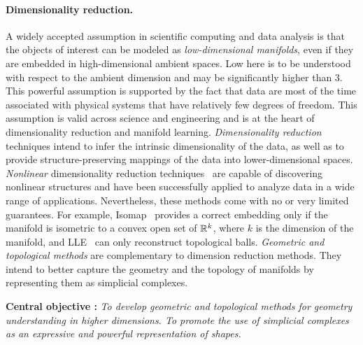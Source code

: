 \paragraph{Dimensionality reduction.} A widely accepted assumption in scientific computing and data analysis is that the objects of interest can be modeled as {\em low-dimensional manifolds}, even if they are embedded in high-dimensional ambient spaces. Low here is to be understood with respect to the ambient dimension and may be significantly higher than 3. This powerful assumption is supported by the fact that data are most of the time associated with physical systems that have relatively few degrees of freedom.  This assumption is valid across science and engineering and is at the heart of dimensionality reduction and manifold learning.
{\em Dimensionality reduction} techniques intend to infer the intrinsic dimensionality of the data, as well as to provide structure-preserving mappings of the data into lower-dimensional spaces. {\em Nonlinear} dimensionality reduction techniques~\cite{lv-nldr-2007} are capable of discovering {nonlinear} structures and have been successfully applied to analyze data in a wide range of applications.
Nevertheless, these methods come with no or very limited guarantees. For example, Isomap~\cite{tsl-isomap-2000} provides a correct embedding only if the manifold is isometric to a convex open set of $\mathbb R ^k$, where $k$ is the dimension of the manifold, and LLE~\cite{rs-lle-2000} can only reconstruct topological balls. {\em Geometric and topological methods} are complementary to dimension reduction methods. They intend to better capture the geometry and the topology of manifolds by representing them as simplicial complexes.

\vspace{2mm}  

{\bf Central objective :} {\em To develop geometric and topological methods for geometry understanding in higher dimensions.  To promote the use  of simplicial complexes as an expressive and powerful representation of shapes. }


